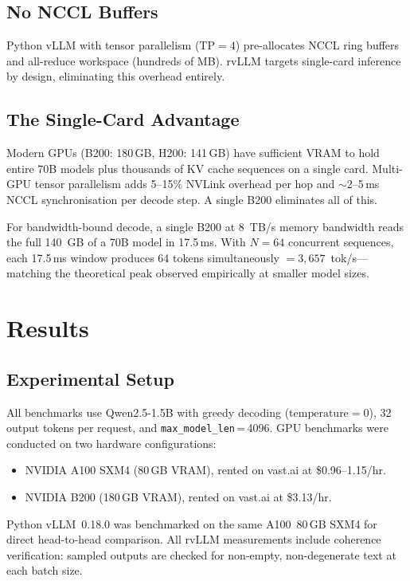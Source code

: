 \documentclass[11pt,a4paper]{article}
\begin{document}
\subsection{No NCCL Buffers}

Python vLLM with tensor parallelism ($\text{TP}\!=\!4$) pre-allocates NCCL ring
buffers and all-reduce workspace (hundreds of MB). rvLLM targets single-card
inference by design, eliminating this overhead entirely.

\subsection{The Single-Card Advantage}

Modern GPUs (B200: 180\,GB, H200: 141\,GB) have sufficient VRAM to hold entire
70B models plus thousands of KV cache sequences on a single card. Multi-GPU tensor
parallelism adds 5--15\% NVLink overhead per hop and $\sim$2--5\,ms NCCL
synchronisation per decode step. A single B200 eliminates all of this.

For bandwidth-bound decode, a single B200 at 8~TB/s memory bandwidth reads the
full 140~GB of a 70B model in 17.5\,ms. With $N\!=\!64$ concurrent sequences,
each 17.5\,ms window produces 64 tokens simultaneously $= 3{,}657$~tok/s---matching
the theoretical peak observed empirically at smaller model sizes.

\section{Results}
\label{sec:results}

\subsection{Experimental Setup}

All benchmarks use Qwen2.5-1.5B with greedy decoding ($\text{temperature}\!=\!0$),
32 output tokens per request, and \texttt{max\_model\_len}\,=\,4096. GPU benchmarks
were conducted on two hardware configurations:
\begin{itemize}
  \item NVIDIA A100 SXM4 (80\,GB VRAM), rented on vast.ai at \$0.96--1.15/hr.
  \item NVIDIA B200 (180\,GB VRAM), rented on vast.ai at \$3.13/hr.
\end{itemize}
Python vLLM~0.18.0 was benchmarked on the same A100~80\,GB SXM4 for direct
head-to-head comparison. All rvLLM measurements include coherence verification:
sampled outputs are checked for non-empty, non-degenerate text at each batch size.
\end{document}
